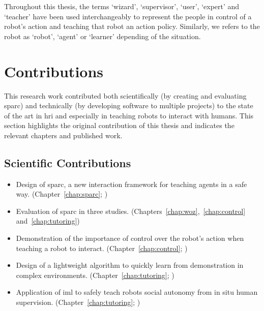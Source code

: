 Throughout this thesis, the terms `wizard', `supervisor', `user', `expert' and `teacher' have been used interchangeably to represent the people in control of a robot's action and teaching that robot an action policy. Similarly, we refers to the robot as `robot', `agent' or `learner' depending of the situation.
%
%

\section{Contributions}\label{sec:intro_contr}

This research work contributed both scientifically (by creating and evaluating \gls{sparc}) and technically (by developing software to multiple projects) to the state of the art in \gls{hri} and especially in teaching robots to interact with humans. This section highlights the original contribution of this thesis and indicates the relevant chapters and published work.

\subsection{Scientific Contributions}
\begin{itemize}
	\item Design of \gls{sparc}, a new interaction framework for teaching agents in a safe way. (Chapter~\ref{chap:sparc}; \citealt{senft2015human,senft2015sparc})
	\item Evaluation of \gls{sparc} in three studies. (Chapters~\ref{chap:woz},~\ref{chap:control} and~\ref{chap:tutoring})
	\item Demonstration of the importance of control over the robot's action when teaching a robot to interact. (Chapter~\ref{chap:control}; \citealt{senft2016sparc,senft2017supervised})
	\item Design of a lightweight algorithm to quickly learn from demonstration in complex environments. (Chapter~\ref{chap:tutoring}; \citealt{senft2017toward})
	\item Application of \gls{iml} to safely teach robots social autonomy from in situ human supervision. (Chapter~\ref{chap:tutoring}; \citealt{senft2018robots})
\end{itemize}

